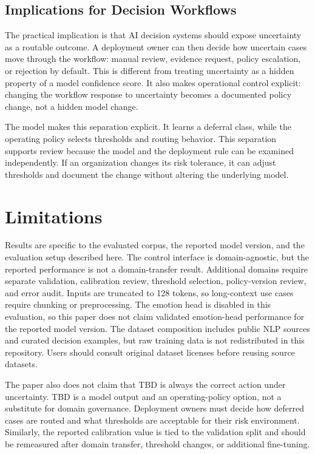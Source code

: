 \documentclass[11pt]{article}
\begin{document}
\subsection{Implications for Decision Workflows}

The practical implication is that AI decision systems should expose uncertainty as a routable outcome. A deployment owner can then decide how uncertain cases move through the workflow: manual review, evidence request, policy escalation, or rejection by default. This is different from treating uncertainty as a hidden property of a model confidence score. It also makes operational control explicit: changing the workflow response to uncertainty becomes a documented policy change, not a hidden model change.

The model makes this separation explicit. It learns a deferral class, while the operating policy selects thresholds and routing behavior. This separation supports review because the model and the deployment rule can be examined independently. If an organization changes its risk tolerance, it can adjust thresholds and document the change without altering the underlying model.

\section{Limitations}

Results are specific to the evaluated corpus, the reported model version, and the evaluation setup described here. The control interface is domain-agnostic, but the reported performance is not a domain-transfer result. Additional domains require separate validation, calibration review, threshold selection, policy-version review, and error audit. Inputs are truncated to 128 tokens, so long-context use cases require chunking or preprocessing. The emotion head is disabled in this evaluation, so this paper does not claim validated emotion-head performance for the reported model version. The dataset composition includes public NLP sources and curated decision examples, but raw training data is not redistributed in this repository. Users should consult original dataset licenses before reusing source datasets.

The paper also does not claim that TBD is always the correct action under uncertainty. TBD is a model output and an operating-policy option, not a substitute for domain governance. Deployment owners must decide how deferred cases are routed and what thresholds are acceptable for their risk environment. Similarly, the reported calibration value is tied to the validation split and should be remeasured after domain transfer, threshold changes, or additional fine-tuning.
\end{document}
